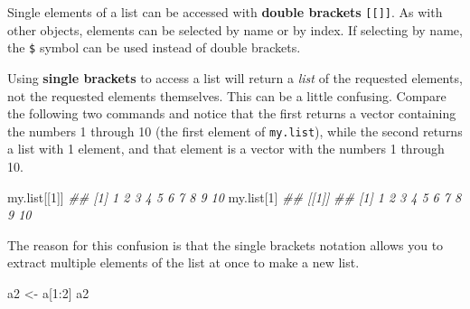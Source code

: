 \documentclass[
  13,
  letterpaper,
]{report}
\newenvironment{Shaded}{\begin{snugshade}}{\end{snugshade}}
\newcommand{\DecValTok}[1]{\textcolor[rgb]{0.68,0.00,0.00}{#1}}
\newcommand{\DocumentationTok}[1]{\textcolor[rgb]{0.37,0.37,0.37}{\textit{#1}}}
\newcommand{\NormalTok}[1]{\textcolor[rgb]{0.00,0.23,0.31}{#1}}
\newcommand{\OtherTok}[1]{\textcolor[rgb]{0.00,0.23,0.31}{#1}}
\newcommand{\SpecialCharTok}[1]{\textcolor[rgb]{0.37,0.37,0.37}{#1}}
\newcommand{\StringTok}[1]{\textcolor[rgb]{0.13,0.47,0.30}{#1}}
\begin{document}
Single elements of a list can be accessed with \textbf{double brackets}
\texttt{{[}{[}{]}{]}}. As with other objects, elements can be selected
by name or by index. If selecting by name, the \texttt{\$} symbol can be
used instead of double brackets.

\begin{Shaded}
\end{Shaded}

Using \textbf{single brackets} to access a list will return a
\emph{list} of the requested elements, not the requested elements
themselves. This can be a little confusing. Compare the following two
commands and notice that the first returns a vector containing the
numbers 1 through 10 (the first element of \texttt{my.list}), while the
second returns a list with 1 element, and that element is a vector with
the numbers 1 through 10.

\begin{Shaded}
\begin{Highlighting}[]
\NormalTok{my.list[[}\DecValTok{1}\NormalTok{]]}
\DocumentationTok{\#\#  [1]  1  2  3  4  5  6  7  8  9 10}
\NormalTok{my.list[}\DecValTok{1}\NormalTok{]}
\DocumentationTok{\#\# [[1]]}
\DocumentationTok{\#\#  [1]  1  2  3  4  5  6  7  8  9 10}
\end{Highlighting}
\end{Shaded}

The reason for this confusion is that the single brackets notation
allows you to extract multiple elements of the list at once to make a
new list.

\begin{Shaded}
\begin{Highlighting}[]
\NormalTok{a2 }\OtherTok{\textless{}{-}}\NormalTok{ a[}\DecValTok{1}\SpecialCharTok{:}\DecValTok{2}\NormalTok{]}
\NormalTok{a2}
\end{Highlighting}
\end{Shaded}
\end{document}
